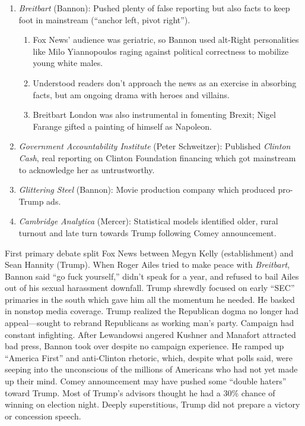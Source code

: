\documentclass[
]{article}
\begin{document}
\begin{enumerate}
\def\labelenumi{\arabic{enumi}.}
\item
  \emph{Breitbart} (Bannon): Pushed plenty of false reporting but also
  facts to keep foot in mainstream (``anchor left, pivot right'').

  \begin{enumerate}
  \def\labelenumii{\arabic{enumii}.}
  \item
    Fox News' audience was geriatric, so Bannon used alt-Right
    personalities like Milo Yiannopoulos raging against political
    correctness to mobilize young white males.
  \item
    Understood readers don't approach the news as an exercise in
    absorbing facts, but am ongoing drama with heroes and villains.
  \item
    Breitbart London was also instrumental in fomenting Brexit; Nigel
    Farange gifted a painting of himself as Napoleon.
  \end{enumerate}
\item
  \emph{Government Accountability Institute} (Peter Schweitzer):
  Published \emph{Clinton Cash}, real reporting on Clinton Foundation
  financing which got mainstream to acknowledge her as untrustworthy.
\item
  \emph{Glittering Steel} (Bannon): Movie production company which
  produced pro-Trump ads.
\item
  \emph{Cambridge Analytica} (Mercer): Statistical models identified
  older, rural turnout and late turn towards Trump following Comey
  announcement.
\end{enumerate}

First primary debate split Fox News between Megyn Kelly (establishment)
and Sean Hannity (Trump). When Roger Ailes tried to make peace with
\emph{Breitbart}, Bannon said ``go fuck yourself,'' didn't speak for a
year, and refused to bail Ailes out of his sexual harassment downfall.
Trump shrewdly focused on early ``SEC'' primaries in the south which
gave him all the momentum he needed. He basked in nonstop media
coverage. Trump realized the Republican dogma no longer had
appeal---sought to rebrand Republicans as working man's party. Campaign
had constant infighting. After Lewandowsi angered Kushner and Manafort
attracted bad press, Bannon took over despite no campaign experience. He
ramped up ``America First'' and anti-Clinton rhetoric, which, despite
what polls said, were seeping into the unconscious of the millions of
Americans who had not yet made up their mind. Comey announcement may
have pushed some ``double haters'' toward Trump. Most of Trump's
advisors thought he had a 30\% chance of winning on election night.
Deeply superstitious, Trump did not prepare a victory or concession
speech.
\end{document}
